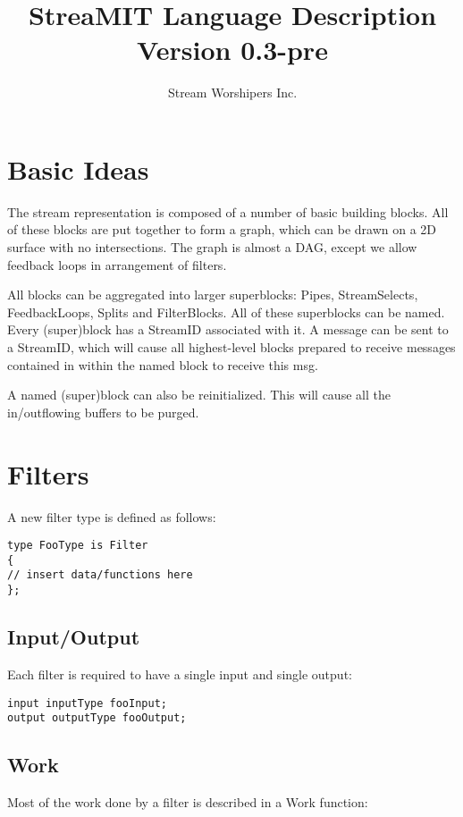\documentclass[twocolumn, draft]{article}
\title{StreaMIT Language Description \\ Version 0.3-pre}
\author{Stream Worshipers Inc.}
\begin{document}
\maketitle

\section{Basic Ideas}

The stream representation is composed of a number of basic building blocks.
All of these blocks are put together to form a graph, which can be drawn
on a 2D surface with no intersections.  The graph is almost a DAG, except
we allow feedback loops in arrangement of filters.

All blocks can be aggregated into larger superblocks:  Pipes, StreamSelects,
FeedbackLoops, Splits and FilterBlocks.  
All of these superblocks can be named.  Every 
(super)block has a StreamID associated with it.  A message can be sent 
to a StreamID, which will cause all highest-level blocks prepared to
receive messages contained in within the named block
to receive this msg.

A named (super)block can also be reinitialized.  This will cause all the 
in/outflowing buffers to be purged.

\section{Filters}
A new filter type is defined as follows:

\begin{verbatim}
type FooType is Filter
{
// insert data/functions here
};
\end{verbatim}

\subsection{Input/Output}

Each filter is required to have a single input and single output:
\begin{verbatim}
input inputType fooInput;
output outputType fooOutput;
\end{verbatim}

\subsection{Work}

Most of the work done by a filter is described in a Work function:
\end{document}
